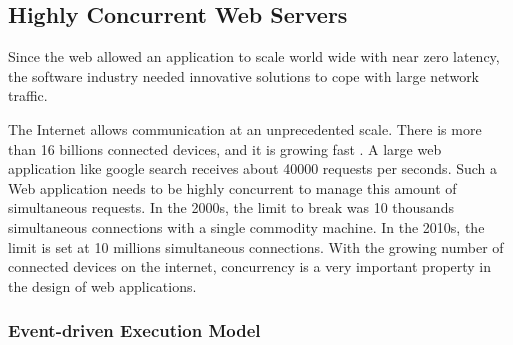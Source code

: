 
\subsection{Highly Concurrent Web Servers} \label{chapter2:web-as-a-platform:web-servers}


Since the web allowed an application to scale world wide with near zero latency, the software industry needed innovative solutions to cope with large network traffic.



The Internet allows communication at an unprecedented scale.
There is more than 16 billions connected devices, and it is growing fast \cite{Hilbert2011}.
A large web application like google search receives about \num{40000} requests per seconds.
Such a Web application needs to be highly concurrent to manage this amount of simultaneous requests.
In the 2000s, the limit to break was 10 thousands simultaneous connections with a single commodity machine.
In the 2010s, the limit is set at 10 millions simultaneous connections.
With the growing number of connected devices on the internet, concurrency is a very important property in the design of web applications.

\subsubsection{Event-driven Execution Model} \label{chapter2:web-as-a-platform:javascript:event-loop}

